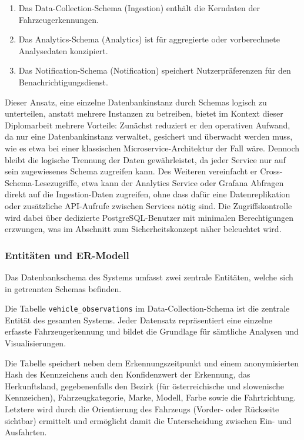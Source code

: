 \begin{enumerate}
    \item Das Data-Collection-Schema (Ingestion) enthält die Kerndaten der Fahrzeugerkennungen.
    \item Das Analytics-Schema (Analytics) ist für aggregierte oder vorberechnete Analysedaten konzipiert.
    \item Das Notification-Schema (Notification) speichert Nutzerpräferenzen für den Benachrichtigungsdienst.
\end{enumerate}

Dieser Ansatz, eine einzelne Datenbankinstanz durch Schemas logisch zu unterteilen, anstatt mehrere Instanzen zu betreiben, bietet im Kontext dieser Diplomarbeit mehrere Vorteile:
Zunächst reduziert er den operativen Aufwand, da nur eine Datenbankinstanz verwaltet, gesichert und überwacht werden muss, wie es etwa bei einer klassischen Microservice-Architektur der Fall wäre.
Dennoch bleibt die logische Trennung der Daten gewährleistet, da jeder Service nur auf sein zugewiesenes Schema zugreifen kann.
Des Weiteren vereinfacht er Cross-Schema-Lesezugriffe, etwa kann der Analytics Service oder Grafana Abfragen direkt auf die Ingestion-Daten zugreifen, ohne dass dafür eine Datenreplikation oder zusätzliche API-Aufrufe zwischen Services nötig sind.
Die Zugriffskontrolle wird dabei über dedizierte PostgreSQL-Benutzer mit minimalen Berechtigungen erzwungen, was im Abschnitt zum Sicherheitskonzept näher beleuchtet wird.

\subsubsection{Entitäten und ER-Modell}

Das Datenbankschema des Systems umfasst zwei zentrale Entitäten, welche sich in getrennten Schemas befinden.

Die Tabelle \texttt{vehicle\_observations} im Data-Collection-Schema ist die zentrale Entität des gesamten Systems.
Jeder Datensatz repräsentiert eine einzelne erfasste Fahrzeugerkennung und bildet die Grundlage für sämtliche Analysen und Visualisierungen.

\newpage
Die Tabelle speichert neben dem Erkennungszeitpunkt und einem anonymisierten Hash des Kennzeichens auch den Konfidenzwert der Erkennung, das Herkunftsland, gegebenenfalls den Bezirk (für österreichische und slowenische Kennzeichen), Fahrzeugkategorie, Marke, Modell, Farbe sowie die Fahrtrichtung.
Letztere wird durch die Orientierung des Fahrzeugs (Vorder- oder Rückseite sichtbar) ermittelt und ermöglicht damit die Unterscheidung zwischen Ein- und Ausfahrten.

